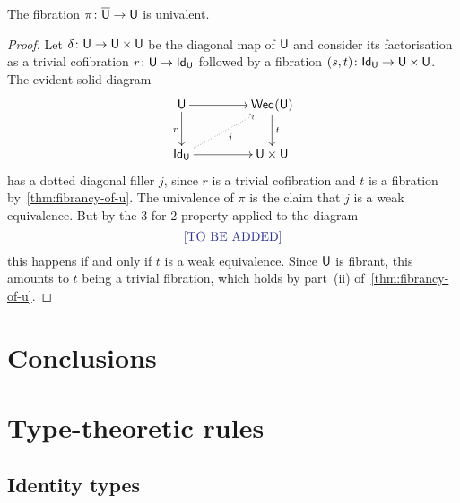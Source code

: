 \documentclass[reqno,10pt,a4paper,oneside,draft]{amsart}
\begin{document}
\begin{corollary} The fibration $\pi \colon \overline{\mathsf{U}} \to \mathsf{U}$ is univalent.
\end{corollary}

\begin{proof} Let $\delta \colon \mathsf{U} \to \mathsf{U} \times \mathsf{U}$ be the diagonal map of $\mathsf{U}$ and consider its factorisation
as a trivial cofibration $r \colon \mathsf{U} \to \mathsf{Id}_{\mathsf{U}}$ followed by a fibration $(s,t) \colon \mathsf{Id}_{\mathsf{U}} \to \mathsf{U} \times \mathsf{U}$. The evident solid diagram
\[
\xymatrix@C=1.5cm{
\U \ar[r] \ar[d]_r & \Weq(\U) \ar[d]^{t} \\
\mathsf{Id}_\U \ar[r]  \ar@{.>}[ur]_{j} &  \U \times \U }
\]
has a dotted diagonal filler $j$, since $r$ is a trivial cofibration and $t$ is a fibration by~\cref{thm:fibrancy-of-u}. The univalence of $\pi$ is the claim that $j$ is a weak equivalence. But by the 3-for-2 property applied to the diagram
\[
\noten{\text{TO BE ADDED}}
\]
this happens if and only if $t$ is a weak equivalence. Since $\mathsf{U}$ is fibrant, this amounts to $t$ being a trivial
fibration, which holds by part~(ii) of~\cref{thm:fibrancy-of-u}. 
\end{proof} 


\bigskip




 

\section{Conclusions}
\label{sec:conout}
\label{sec:conclusions}



\bigskip


\appendix

\section{Type-theoretic rules}

\subsection*{Identity types}
\end{document}

